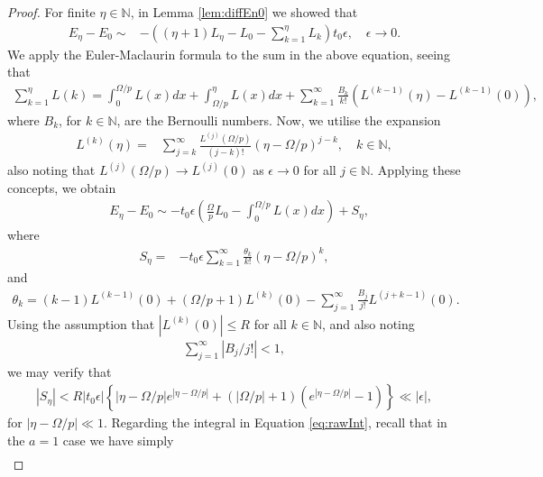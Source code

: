 \documentclass[10pt,a4paper]{amsart}
\begin{document}
\begin{proof}
    For finite $\eta\in\mathbb{N}$, in Lemma \ref{lem:diffEn0} we showed that
    \begin{align*}
        E_\eta-E_{0}\sim&-\left((\eta+1)L_\eta-L_0-\sum_{k=1}^{\eta}L_k\right)t_0\epsilon,\quad\epsilon\to0.
    \end{align*}
    We apply the Euler-Maclaurin formula to the sum in the above equation, seeing that
    \begin{align*}
        \sum_{k=1}^{\eta}L(k)=\int_{0}^{\Omega/p}L(x)dx+\int_{\Omega/p}^{\eta}L(x)dx+\sum_{k=1}^{\infty}\frac{B_k}{k!}\left(L^{(k-1)}(\eta)-L^{(k-1)}(0)\right),
    \end{align*}
    where $B_k$, for $k\in\mathbb{N}$, are the Bernoulli numbers. Now, we utilise the expansion
    \begin{align*}
        L^{(k)}(\eta)=&\sum_{j=k}^{\infty}\frac{L^{(j)}(\Omega/p)}{(j-k)!}(\eta-\Omega/p)^{j-k},\quad k\in\mathbb{N},
    \end{align*}
    also noting that $L^{(j)}(\Omega/p)\to L^{(j)}(0)$ as $\epsilon\to0$ for all $j\in\mathbb{N}$. Applying these concepts, we obtain
    \begin{align}\label{eq:rawInt}
        &E_\eta-E_{0}\sim-t_0\epsilon\left(\frac{\Omega}{p}L_0-\int_{0}^{\Omega/p}L(x)dx\right)+S_\eta,
    \end{align}
    where
    \begin{align*}
        S_\eta=&-t_0\epsilon\sum_{k=1}^{\infty}\frac{\theta_k}{k!}(\eta-\Omega/p)^{k},
    \end{align*}
    and
    \begin{align*}
        \theta_k=(k-1)L^{(k-1)}(0)+\left(\Omega/p+1\right)L^{(k)}(0)-\sum_{j=1}^{\infty}\frac{B_j}{j!}L^{(j+k-1)}(0).
    \end{align*}
    Using the assumption that $|L^{(k)}(0)|\leq R$ for all $k\in\mathbb{N}$, and also noting
    \begin{align*}
        \sum_{j=1}^{\infty}|B_j/j!|<1,
    \end{align*}
    we may verify that
    \begin{align*}
        |S_\eta|<R|t_0\epsilon|\left\{|\eta-\Omega/p|e^{|\eta-\Omega/p|}+\left(\left|\Omega/p\right|+1\right)\left(e^{|\eta-\Omega/p|}-1\right)\right\}\ll|\epsilon|,
    \end{align*}
    for $|\eta-\Omega/p|\ll1$. Regarding the integral in Equation \eqref{eq:rawInt}, recall that in the $a=1$ case we have simply
    \begin{align*}

\end{align*}
\end{proof}
\end{document}
